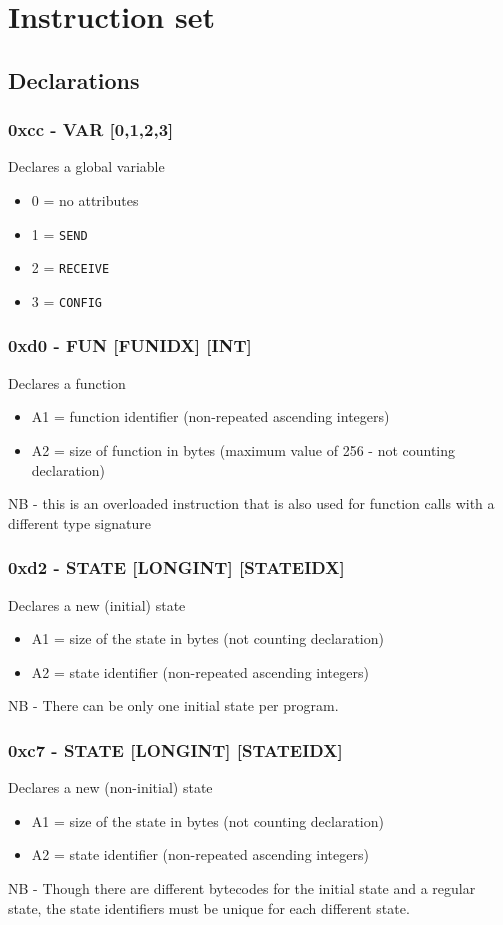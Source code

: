 \documentclass[12pt]{scrbook}
\begin{document}
\section{Instruction set}

\subsection{Declarations}

\subsubsection{0xcc - VAR [0,1,2,3]} 
Declares a global variable
\begin{itemize}
\item 0 = no attributes
\item 1 = \texttt{SEND}
\item 2 = \texttt{RECEIVE}
\item 3 = \texttt{CONFIG}
\end{itemize}

\subsubsection{0xd0 - FUN [FUNIDX] [INT]}
Declares a function
\begin{itemize}
\item A1 = function identifier (non-repeated ascending integers)
\item A2 = size of function in bytes (maximum value of 256 - not counting declaration)
\end{itemize}
NB - this is an overloaded instruction that is also used for function calls with a different type
signature

\subsubsection{0xd2 - STATE [LONGINT] [STATEIDX]}
Declares a new (initial) state
\begin{itemize}
\item A1 = size of the state in bytes (not counting declaration)
\item A2 = state identifier (non-repeated ascending integers)
\end{itemize}
NB - There can be only one initial state per program.

\subsubsection{0xc7 - STATE [LONGINT] [STATEIDX]}
Declares a new (non-initial) state
\begin{itemize}
\item A1 = size of the state in bytes (not counting declaration)
\item A2 = state identifier (non-repeated ascending integers)
\end{itemize}
NB - Though there are different bytecodes for the initial state and a regular state,
the state identifiers must be unique for each different state.
\end{document}

